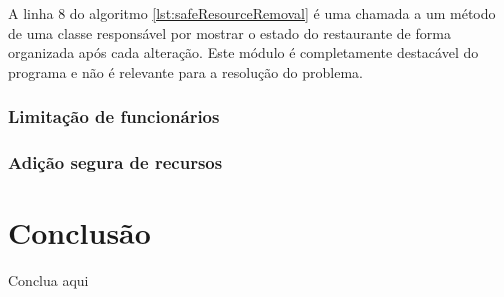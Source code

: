 \documentclass[a4paper]{article}
\begin{document}
A linha 8 do algoritmo \ref{lst:safeResourceRemoval} é uma chamada a um método de uma classe responsável por mostrar o estado do restaurante de forma organizada após cada alteração. Este módulo é completamente destacável do programa e não é relevante para a resolução do problema.

\subsubsection{Limitação de funcionários}
\subsubsection{Adição segura de recursos}

\section{Conclusão}

Conclua aqui

\printbibliography
\end{document}
